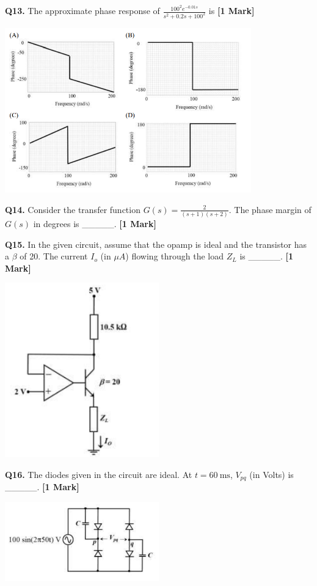 \documentclass[11pt]{article}
\newcommand{\questiona}[2]{
    \noindent\textbf{Q#2.} #1 \hfill \textbf{[1 Mark]}
}
\begin{document}
\questiona{The approximate phase response of \(\frac{100^2 e^{-0.01s}}{s^2 + 0.2s + 100^2}\) is}{13}
\begin{center}
\includegraphics[width=0.8\textwidth]{figures/13.png}
\end{center}

\vspace{0.5cm}

\questiona{Consider the transfer function \(G(s) = \frac{2}{(s+1)(s+2)}\). The phase margin of \(G(s)\) in degrees is \_\_\_\_\_.}{14}
\vspace{0.5cm}

\questiona{In the given circuit, assume that the opamp is ideal and the transistor has a \(\beta\) of 20. The current \(I_o\) (in \(\mu A\)) flowing through the load \(Z_L\) is \_\_\_\_\_.}{15}
\begin{center}
\includegraphics[width=0.5\textwidth]{figures/15.png}
\end{center}
\vspace{0.5cm}

\questiona{The diodes given in the circuit are ideal. At \(t = 60\ \text{ms}\), \(V_{pq}\) (in Volts) is \_\_\_\_\_.}{16}
\begin{center}
\includegraphics[width=0.5\textwidth]{figures/16.png}
\end{center}
\vspace{0.5cm}
\end{document}
